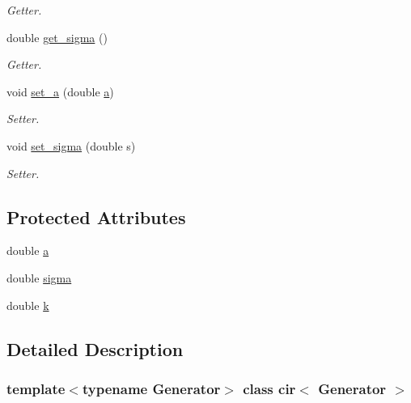 \begin{DoxyCompactItemize}
\begin{DoxyCompactList}\small\item\em Getter. \end{DoxyCompactList}\item 
\mbox{\label{classcir_a3269ff6845cca07d9e99c139902fc3d4}} 
double \mbox{\hyperlink{classcir_a3269ff6845cca07d9e99c139902fc3d4}{get\+\_\+sigma}} ()
\begin{DoxyCompactList}\small\item\em Getter. \end{DoxyCompactList}\item 
\mbox{\label{classcir_a071e1fa837b80e16de53f82223725bdf}} 
void \mbox{\hyperlink{classcir_a071e1fa837b80e16de53f82223725bdf}{set\+\_\+a}} (double \mbox{\hyperlink{classcir_a358578305ea60d31c00546233304651c}{a}})
\begin{DoxyCompactList}\small\item\em Setter. \end{DoxyCompactList}\item 
\mbox{\label{classcir_a0f16e4b0fc9684e5ff41c7164bca2a2e}} 
void \mbox{\hyperlink{classcir_a0f16e4b0fc9684e5ff41c7164bca2a2e}{set\+\_\+sigma}} (double s)
\begin{DoxyCompactList}\small\item\em Setter. \end{DoxyCompactList}\end{DoxyCompactItemize}
\subsection*{Protected Attributes}
\begin{DoxyCompactItemize}
\item 
double \mbox{\hyperlink{classcir_a358578305ea60d31c00546233304651c}{a}}
\item 
double \mbox{\hyperlink{classcir_a76df757acc0179e1cdf766ed6627efc9}{sigma}}
\item 
double \mbox{\hyperlink{classcir_aa5b05ff03ee8bb587ea94426a9ce704b}{k}}
\end{DoxyCompactItemize}


\subsection{Detailed Description}
\subsubsection*{template$<$typename Generator$>$\newline
class cir$<$ Generator $>$}

